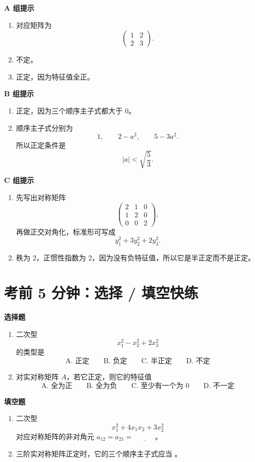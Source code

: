 \documentclass[11pt,oneside,UTF8]{ctexbook}
\begin{document}
\begin{summarybox}[答案提示]
\textbf{A 组提示}
\begin{enumerate}[label=\textbf{A\arabic*.}]
  \item 对应矩阵为
  \[
  \begin{pmatrix}
  1&2\\
  2&3
  \end{pmatrix}.
  \]
  \item 不定。
  \item 正定，因为特征值全正。
\end{enumerate}

\textbf{B 组提示}
\begin{enumerate}[label=\textbf{B\arabic*.}]
  \item 正定，因为三个顺序主子式都大于 \(0\)。
  \item 顺序主子式分别为
  \[
  1,\qquad 2-a^2,\qquad 5-3a^2.
  \]
  所以正定条件是
  \[
  |a|<\sqrt{\frac53}.
  \]
\end{enumerate}

\textbf{C 组提示}
\begin{enumerate}[label=\textbf{C\arabic*.}]
  \item 先写出对称矩阵
  \[
  \begin{pmatrix}
  2&1&0\\
  1&2&0\\
  0&0&2
  \end{pmatrix},
  \]
  再做正交对角化，标准形可写成
  \[
  y_1^2+3y_2^2+2y_3^2.
  \]
  \item 秩为 \(2\)，正惯性指数为 \(2\)，因为没有负特征值，所以它是半正定而不是正定。
\end{enumerate}
\end{summarybox}

\section{考前 5 分钟：选择 / 填空快练}

\begin{exercisebox}[第 5 章选择与填空快练]
\textbf{选择题}
\begin{enumerate}[label=\textbf{选\arabic*.}]
  \item 二次型
  \[
  x_1^2-x_2^2+2x_3^2
  \]
  的类型是
  \[
  \text{A. 正定}\qquad
  \text{B. 负定}\qquad
  \text{C. 半正定}\qquad
  \text{D. 不定}
  \]
  \item 对实对称矩阵 \(A\)，若它正定，则它的特征值
  \[
  \text{A. 全为正}\qquad
  \text{B. 全为负}\qquad
  \text{C. 至少有一个为 0}\qquad
  \text{D. 不一定}
  \]
\end{enumerate}

\textbf{填空题}
\begin{enumerate}[label=\textbf{填\arabic*.}]
  \item 二次型
  \[
  x_1^2+4x_1x_2+3x_2^2
  \]
  对应对称矩阵的非对角元 \(a_{12}=a_{21}=\underline{\hspace{3em}}\)。
  \item 三阶实对称矩阵正定时，它的三个顺序主子式应当 \underline{\hspace{6em}}。
\end{enumerate}
\end{exercisebox}
\end{document}
